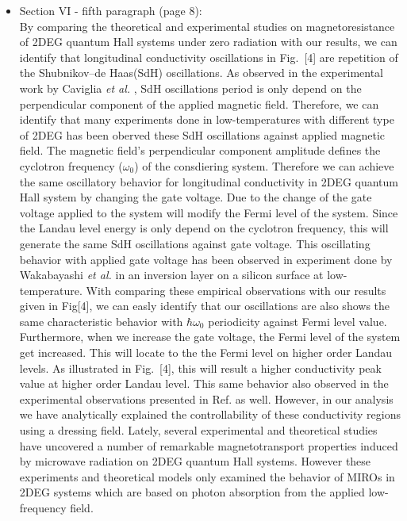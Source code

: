 \documentclass{article}
\begin{document}
\begin{itemize}
  \item Section VI - fifth paragraph (page 8):\\
  {\color{Maroon}
  By comparing the theoretical \cite{ando72,ando74_1,ando74_2,ando74_3,ando74_4,ando82,endo09} and experimental \cite{endo09,wakabayashi78,ochiai190,mancoff96,arapov02,grbic04,caviglia10} studies on magnetoresistance of 2DEG quantum Hall systems under zero radiation with our results, we can identify that longitudinal conductivity oscillations in Fig.~[4] are repetition of the Shubnikov–de Haas(SdH) oscillations.
  As observed in the experimental work by Caviglia \textit{et al.} \cite{caviglia10}, SdH oscillations period is only depend on the perpendicular component of the applied magnetic field.
  Therefore, we can identify that many experiments done in low-temperatures \cite{endo09,ochiai190,mancoff96,arapov02,grbic04,caviglia10} with different type of 2DEG has been oberved these SdH oscillations against applied magnetic field.
  The magnetic field's perpendicular component amplitude defines the cyclotron frequency ($\omega_0$) of the consdiering system.
  Therefore we can achieve the same oscillatory behavior for longitudinal conductivity in 2DEG quantum Hall system by changing the gate voltage. Due to the change of the gate voltage applied to the system will modify the Fermi level of the system.
  Since the Landau level energy is only depend on the cyclotron frequency, this will generate the same SdH oscillations against gate voltage.
  This oscillating behavior with applied gate voltage has been observed in experiment done by Wakabayashi \textit{et al.} \cite{wakabayashi78} in an inversion layer on a silicon surface at low-temperature. With comparing these empirical observations with our results given in Fig[4], we can easly identify that our oscillations are also shows the same characteristic behavior with $\hbar\omega_0$ periodicity against Fermi level value. Furthermore, when we increase the gate voltage, the Fermi level of the system get increased. This will locate to the the Fermi level on higher order Landau levels. As illustrated in Fig.~[4], this will result a higher conductivity peak value at higher order Landau level. This same behavior also observed in the experimental observations presented in Ref. \cite{wakabayashi78} as well. However, in our analysis we have analytically explained the controllability of these conductivity regions using a dressing field.
  Lately, several experimental \cite{zudov01,mani02,zudov03,mani04} and theoretical \cite{durst03,dmitriev03,dmitriev05,dmitriev09} studies have uncovered a number of remarkable magnetotransport properties induced by microwave radiation on 2DEG quantum Hall systems. However these experiments and theoretical models only examined the behavior of MIROs in 2DEG systems which are based on photon absorption from the applied low-frequency field.
}
\end{itemize}
\end{document}

